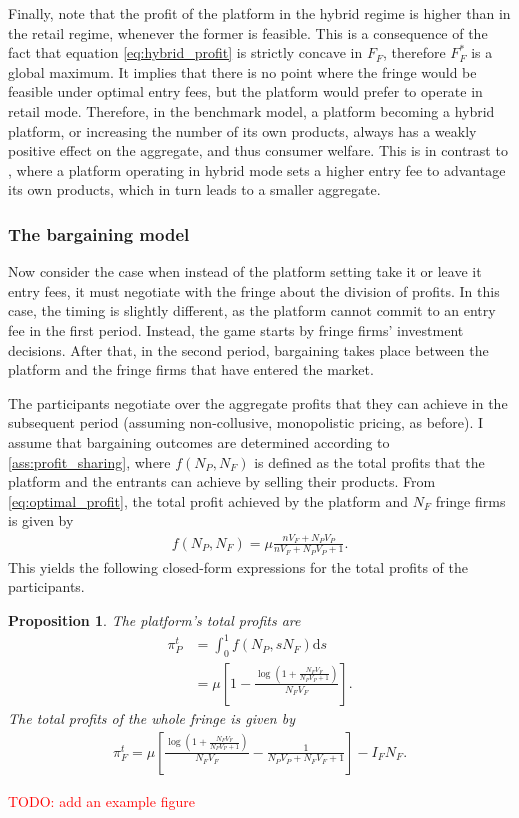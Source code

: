 \documentclass[a4paper]{article}
\newtheorem{proposition}{Proposition}
\newcommand{\ds}{\mathrm{d}s}
\begin{document}
Finally, note that the profit of the platform in the hybrid regime is higher than in the retail regime, whenever the former is feasible.
This is a consequence of the fact that equation \eqref{eq:hybrid_profit} is strictly concave in $F_F$, therefore $F_F^*$ is a global maximum.
It implies that there is no point where the fringe would be feasible under optimal entry fees, but the platform would prefer to operate in retail mode.
Therefore, in the benchmark model, a platform becoming a hybrid platform, or increasing the number of its own products, always has a weakly positive effect on the aggregate, and thus consumer welfare.
This is in contrast to \textcite{anderson2021hybrid}, where a platform operating in hybrid mode sets a higher entry fee to advantage its own products, which in turn leads to a smaller aggregate.


\subsubsection{The bargaining model}

Now consider the case when instead of the platform setting take it or leave it entry fees, it must negotiate with the fringe about the division of profits.
In this case, the timing is slightly different, as the platform cannot commit to an entry fee in the first period.
Instead, the game starts by fringe firms' investment decisions.
After that, in the second period, bargaining takes place between the platform and the fringe firms that have entered the market.

The participants negotiate over the aggregate profits that they can achieve in the subsequent period (assuming non-collusive, monopolistic pricing, as before).
I assume that bargaining outcomes are determined according to \cref{ass:profit_sharing}, where $f(N_P, N_F)$ is defined as the total profits that the platform and the entrants can achieve by selling their products.
From \cref{eq:optimal_profit}, the total profit achieved by the platform and $N_F$ fringe firms is given by
\begin{align*}
    f(N_P, N_F) = \mu \frac{n V_F + N_P V_P}{n V_F + N_P V_P + 1}.
\end{align*}
This yields the following closed-form expressions for the total profits of the participants.
\begin{proposition}
    The platform's total profits are
    \begin{align*}
        \pi^t_P &=\int_0^1 f(N_P, sN_F) \ds \\
                &= \mu \left[ 1 - \frac{\log \left(1 + \frac{N_F V_F}{N_P V_P + 1} \right)}{N_F V_F} \right].
    \end{align*}
    The total profits of the whole fringe is given by
    \begin{align*}
        \pi^t_F = \mu \left[ \frac{\log \left( 1 + \frac{N_F V_F}{N_P V_P + 1} \right)}{N_F V_F} - \frac{1}{N_P V_P + N_F V_F + 1} \right] - I_F N_F.
    \end{align*}
\end{proposition}
\textcolor{red}{TODO: add an example figure}
\end{document}
